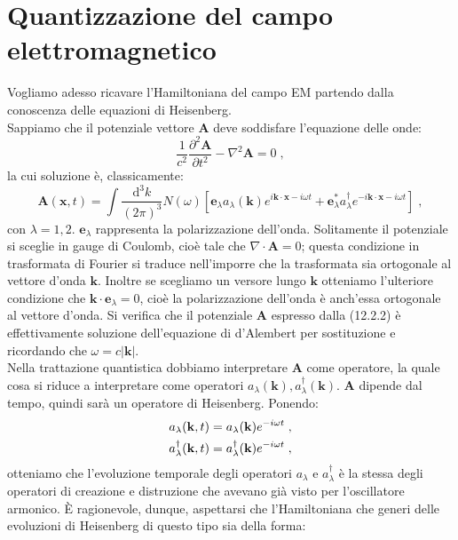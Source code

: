 \documentclass[12pt,a4paper]{report}
\theoremstyle{definition}
\newcommand{\pdev}[3][]{\frac{\partial^{#1} #2}{\partial #3^{#1}}}
\numberwithin{equation}{section}
\newcommand{\diff}[1][]{\mathrm{d}#1}
\newcommand{\adj}[1]{#1^{\dagger}}
\begin{document}
\section{Quantizzazione del campo elettromagnetico}
Vogliamo adesso ricavare l'Hamiltoniana del campo EM partendo dalla conoscenza delle equazioni di Heisenberg. \\
Sappiamo che il potenziale vettore $\mathbf{A}$ deve soddisfare l'equazione delle onde:
\begin{equation}
\frac{1}{c^2}\pdev[2]{\mathbf{A}}{t}-\nabla^2\mathbf{A}=0\;,
\end{equation}
la cui soluzione è, classicamente:
\begin{equation}
\mathbf{A}(\mathbf{x},t)=\int\frac{\diff^3{k}}{(2\pi)^3} N(\omega)\left[\mathbf{e}_{\lambda}a_{\lambda}(\mathbf{k})e^{i\mathbf{k}\cdot\mathbf{x}-i\omega t}+\mathbf{e}^*_{\lambda}\adj{a_{\lambda}}e^{-i\mathbf{k}\cdot\mathbf{x}-i\omega t}\right]\;,
\end{equation}
con $\lambda=1,2$. $\mathbf{e}_{\lambda}$ rappresenta la polarizzazione dell'onda. Solitamente il potenziale si sceglie in gauge di Coulomb, cioè tale che $\nabla\cdot\mathbf{A}=0$; questa condizione in trasformata di Fourier si traduce nell'imporre che la trasformata sia ortogonale al vettore d'onda $\mathbf{k}$. Inoltre se scegliamo un versore lungo $\mathbf{k}$ otteniamo l'ulteriore condizione che $\mathbf{k}\cdot\mathbf{e}_{\lambda}=0$, cioè la polarizzazione dell'onda è anch'essa ortogonale al vettore d'onda. Si verifica che il potenziale $\mathbf{A}$ espresso dalla (12.2.2) è effettivamente soluzione dell'equazione di d'Alembert per sostituzione e ricordando che $\omega=c|\mathbf{k}|$. \\
Nella trattazione quantistica dobbiamo interpretare $\mathbf{A}$ come operatore, la quale cosa si riduce a interpretare come operatori $a_{\lambda}(\mathbf{k}),\adj{a_{\lambda}}(\mathbf{k})$. $\mathbf{A}$ dipende dal tempo, quindi sarà un operatore di Heisenberg. Ponendo:
\begin{align}
a_{\lambda}(\mathbf{k},t)&= a_{\lambda}(\mathbf{k})e^{-i\omega t} \notag\;, \\
\adj{a_{\lambda}}(\mathbf{k},t) &= \adj{a_{\lambda}}(\mathbf{k})e^{-i\omega t}\;,
\end{align}
otteniamo che l'evoluzione temporale degli operatori $a_{\lambda}$ e $\adj{a_{\lambda}}$ è la stessa degli operatori di creazione e distruzione che avevano già visto per l'oscillatore armonico. È ragionevole, dunque, aspettarsi che l'Hamiltoniana che generi delle evoluzioni di Heisenberg di questo tipo sia della forma:
\end{document}
